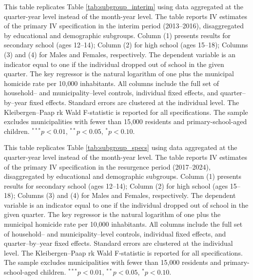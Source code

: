 \documentclass[12pt,letter,english,intoc,bibliography=totoc,index=totoc,BCOR10mm,captions=tableheading,nottitlepage,fleqn]{article}
\theoremstyle{break}
\begin{document}
\begin{table}[H]
\centering
\caption{Quarterly Subgroup Estimates: Interim Period (2013--2016)}
\label{tab:subgroup_interim_quarterly}
\centering
\scriptsize 

\begin{minipage}{0.95\linewidth}
    \scriptsize \singlespacing
    This table replicates Table \ref{tab:subgroup_interim} using data aggregated at the quarter-year level instead of the month-year level. The table reports IV estimates of the primary IV specification in the interim period (2013--2016), disaggregated by educational and demographic subgroups. Column (1) presents results for secondary school (ages 12--14); Column (2) for high school (ages 15--18); Columns (3) and (4) for Males and Females, respectively. The dependent variable is an indicator equal to one if the individual dropped out of school in the given quarter. The key regressor is the natural logarithm of one plus the municipal homicide rate per 10{,}000 inhabitants. All columns include the full set of household-- and municipality--level controls, individual fixed effects, and quarter--by--year fixed effects. Standard errors are clustered at the individual level. The Kleibergen--Paap rk Wald F-statistic is reported for all specifications. The sample excludes municipalities with fewer than 15{,}000 residents and primary-school-aged children.
 $^{***}p<0.01$, $^{**}p<0.05$, $^{*}p<0.10$.
    \end{minipage}
\end{table}

\begin{table}[H]
\centering
\caption{Quarterly Subgroup Estimates: Resurgence Period (2017--2024)}
\label{tab:subgroup_respike_quarterly}
\centering
\scriptsize 

\begin{minipage}{0.95\linewidth}
    \scriptsize \singlespacing
    This table replicates Table \ref{tab:subgroup_specs} using data aggregated at the quarter-year level instead of the month-year level. The table reports IV estimates of the primary IV specification in the resurgence period (2017--2024), disaggregated by educational and demographic subgroups. Column (1) presents results for secondary school (ages 12--14); Column (2) for high school (ages 15--18); Columns (3) and (4) for Males and Females, respectively. The dependent variable is an indicator equal to one if the individual dropped out of school in the given quarter. The key regressor is the natural logarithm of one plus the municipal homicide rate per 10{,}000 inhabitants. All columns include the full set of household-- and municipality--level controls, individual fixed effects, and quarter--by--year fixed effects. Standard errors are clustered at the individual level. The Kleibergen--Paap rk Wald F-statistic is reported for all specifications. The sample excludes municipalities with fewer than 15{,}000 residents and primary-school-aged children.
 $^{***}p<0.01$, $^{**}p<0.05$, $^{*}p<0.10$.
    \end{minipage}
\end{table}
\end{document}

